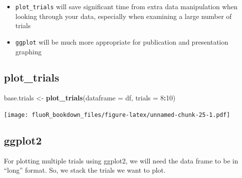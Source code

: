 \documentclass[
]{book}
\newenvironment{Shaded}{\begin{snugshade}}{\end{snugshade}}
\newcommand{\CommentTok}[1]{\textcolor[rgb]{0.56,0.35,0.01}{\textit{#1}}}
\newcommand{\DataTypeTok}[1]{\textcolor[rgb]{0.13,0.29,0.53}{#1}}
\newcommand{\DecValTok}[1]{\textcolor[rgb]{0.00,0.00,0.81}{#1}}
\newcommand{\KeywordTok}[1]{\textcolor[rgb]{0.13,0.29,0.53}{\textbf{#1}}}
\newcommand{\NormalTok}[1]{#1}
\newcommand{\OperatorTok}[1]{\textcolor[rgb]{0.81,0.36,0.00}{\textbf{#1}}}
\newcommand{\StringTok}[1]{\textcolor[rgb]{0.31,0.60,0.02}{#1}}
\providecommand{\tightlist}{%
  \setlength{\itemsep}{0pt}\setlength{\parskip}{0pt}}
\begin{document}
\begin{itemize}
\tightlist
\item
  \texttt{plot\_trials} will save significant time from extra data manipulation when looking through your data, especially when examining a large number of trials
\item
  \texttt{ggplot} will be much more appropriate for publication and presentation graphing
\end{itemize}

\hypertarget{vis-multiple-plotfluor}{%
\subsection{plot\_trials}\label{vis-multiple-plotfluor}}

\begin{Shaded}
\begin{Highlighting}[]
\NormalTok{base.trials <-}\StringTok{ }\KeywordTok{plot_trials}\NormalTok{(}\DataTypeTok{dataframe =}\NormalTok{ df,}
                           \DataTypeTok{trials =} \DecValTok{8}\OperatorTok{:}\DecValTok{10}\NormalTok{)}
\end{Highlighting}
\end{Shaded}

\texttt{[image: fluoR\_bookdown\_files/figure-latex/unnamed-chunk-25-1.pdf]}

\hypertarget{vis-multiple-plotgg}{%
\subsection{ggplot2}\label{vis-multiple-plotgg}}

For plotting multiple trials using ggplot2, we will need the data frame to be in ``long'' format. So, we stack the trials we want to plot.

\begin{Shaded}
\end{Shaded}
\end{document}
